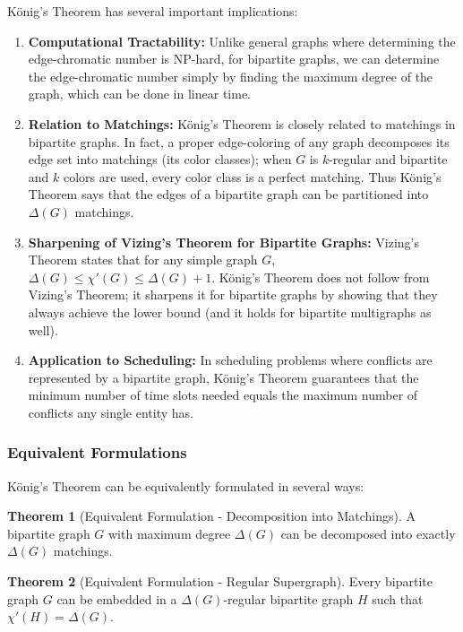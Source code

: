 \documentclass{article}
\theoremstyle{definition}
\newtheorem{theorem}{Theorem}
\begin{document}
König's Theorem has several important implications:

\begin{enumerate}
\item \textbf{Computational Tractability:} Unlike general graphs where determining the edge-chromatic number is NP-hard, for bipartite graphs, we can determine the edge-chromatic number simply by finding the maximum degree of the graph, which can be done in linear time.

\item \textbf{Relation to Matchings:} König's Theorem is closely related to matchings in bipartite graphs. In fact, a proper edge-coloring of any graph decomposes its edge set into matchings (its color classes); when $G$ is $k$-regular and bipartite and $k$ colors are used, every color class is a perfect matching. Thus König's Theorem says that the edges of a bipartite graph can be partitioned into $\Delta(G)$ matchings.

\item \textbf{Sharpening of Vizing's Theorem for Bipartite Graphs:} Vizing's Theorem states that for any simple graph $G$, $\Delta(G) \leq \chi'(G) \leq \Delta(G) + 1$. König's Theorem does not follow from Vizing's Theorem; it sharpens it for bipartite graphs by showing that they always achieve the lower bound (and it holds for bipartite multigraphs as well).

\item \textbf{Application to Scheduling:} In scheduling problems where conflicts are represented by a bipartite graph, König's Theorem guarantees that the minimum number of time slots needed equals the maximum number of conflicts any single entity has.
\end{enumerate}

\subsubsection{Equivalent Formulations}

König's Theorem can be equivalently formulated in several ways:

\begin{theorem}[Equivalent Formulation - Decomposition into Matchings]
A bipartite graph $G$ with maximum degree $\Delta(G)$ can be decomposed into exactly $\Delta(G)$ matchings.
\end{theorem}

\begin{theorem}[Equivalent Formulation - Regular Supergraph]
Every bipartite graph $G$ can be embedded in a $\Delta(G)$-regular bipartite graph $H$ such that $\chi'(H) = \Delta(G)$.
\end{theorem}
\end{document}
